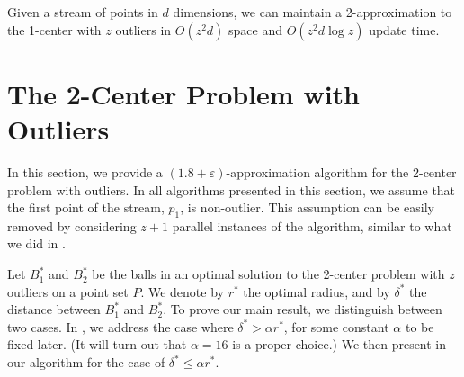 \documentclass[envcountsame]{cls/cccg15}
\renewcommand{\O}{\ensuremath{{O}}}
\newcommand{\textproc}{\textsc}
\newcommand{\lee}{\leqslant}
\renewcommand{\leq}{\lee}
\newcommand{\eps}{\varepsilon}
\begin{document}
\begin{theorem} \label{thm:1-center-stream}
	Given a stream of points in $d$ dimensions,
	we can maintain a 2-approximation to the 1-center with $z$ outliers
	in $\O(z^2d)$ space and $\O (z^2d\log z)$ update time.
\end{theorem}

%






\section{The 2-Center Problem with Outliers}
\label{sec:2-center}

In this section, we provide a $(1.8 + \eps)$-approximation algorithm
for the 2-center problem with outliers.
In all algorithms presented in this section,
we assume that the first point of the stream, $p_1$, is non-outlier. 
This assumption can be easily removed by considering $z + 1$ parallel instances of the algorithm, 
similar to what we did in .

Let $B_1^*$ and $B_2^*$ be the balls
in an optimal solution to the 2-center problem with $z$ outliers on a point set $P$.
We denote by $r^*$ the optimal radius,
and by $\delta^*$ the distance between $B_1^*$ and $B_2^*$.
To prove our main result, we distinguish between two cases.
In , we address the case where $\delta^* > \alpha r^*$, 
for some constant $\alpha$ to be fixed later.
(It will turn out that $\alpha = 16$ is a proper choice.)
We then present in  
our algorithm for the case of $\delta^* \leq \alpha r^*$.
\end{document}
